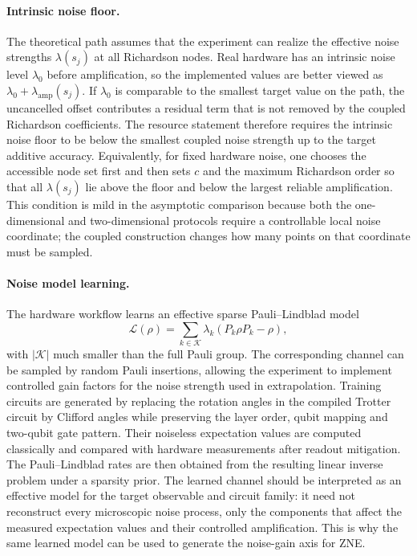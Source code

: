 \documentclass[aps,pra,reprint,superscriptaddress]{revtex4-2}
\newcommand{\Lind}{\mathcal{L}}
\begin{document}
\paragraph{Intrinsic noise floor.}
The theoretical path assumes that the experiment can realize the effective noise strengths $\lambda(s_j)$ at all Richardson nodes.
Real hardware has an intrinsic noise level $\lambda_0$ before amplification, so the implemented values are better viewed as $\lambda_0+\lambda_{\mathrm{amp}}(s_j)$.
If $\lambda_0$ is comparable to the smallest target value on the path, the uncancelled offset contributes a residual term that is not removed by the coupled Richardson coefficients.
The resource statement therefore requires the intrinsic noise floor to be below the smallest coupled noise strength up to the target additive accuracy.
Equivalently, for fixed hardware noise, one chooses the accessible node set first and then sets $c$ and the maximum Richardson order so that all $\lambda(s_j)$ lie above the floor and below the largest reliable amplification.
This condition is mild in the asymptotic comparison because both the one-dimensional and two-dimensional protocols require a controllable local noise coordinate; the coupled construction changes how many points on that coordinate must be sampled.

\paragraph{Noise model learning.}
The hardware workflow learns an effective sparse Pauli--Lindblad model
\begin{equation}
    \Lind(\rho)=\sum_{k\in\mathcal{K}}\lambda_k(P_k\rho P_k-\rho),
\end{equation}
with $|\mathcal{K}|$ much smaller than the full Pauli group.
The corresponding channel can be sampled by random Pauli insertions, allowing the experiment to implement controlled gain factors for the noise strength used in extrapolation.
Training circuits are generated by replacing the rotation angles in the compiled Trotter circuit by Clifford angles while preserving the layer order, qubit mapping and two-qubit gate pattern.
Their noiseless expectation values are computed classically and compared with hardware measurements after readout mitigation.
The Pauli--Lindblad rates are then obtained from the resulting linear inverse problem under a sparsity prior.
The learned channel should be interpreted as an effective model for the target observable and circuit family: it need not reconstruct every microscopic noise process, only the components that affect the measured expectation values and their controlled amplification.
This is why the same learned model can be used to generate the noise-gain axis for ZNE.
\end{document}
